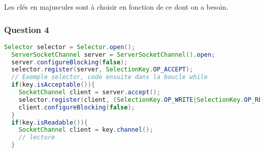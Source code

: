 Les clés en majuscules sont à choisir en fonction de ce dont on a besoin.

\subsubsection{Question 4}

\begin{lstlisting}[language=Java,caption={Serveur Mono-Thread qui gère jusqu'à 10 clients en simultanés},captionpos=b]
  Selector selector = Selector.open();
  ServerSocketChannel server = ServerSocketChannel().open;
  server.configureBlocking(false);
  selector.register(server, SelectionKey.OP_ACCEPT);
  // Exemple selector, code ensuite dans la boucle while
  if(key.isAcceptable()){
    SocketChannel client = server.accept();
    selector.register(client, (SelectionKey.OP_WRITE|SelectionKey.OP_READ));
    client.configureBlocking(false);
  }
  if(key.isReadable()){
    SocketChannel client = key.channel();
    // lecture
  }
\end{lstlisting}
